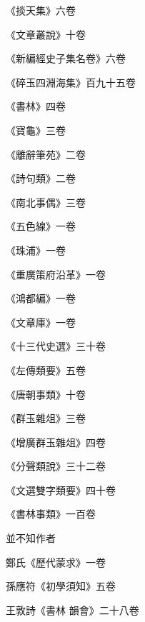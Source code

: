 \begin{pinyinscope}
 《掞天集》六卷



 《文章叢說》十卷



 《新編經史子集名卷》六卷



 《碎玉四淵海集》百九十五卷



 《書林》四卷



 《寶龜》三卷



 《離辭筆苑》二卷



 《詩句類》二卷



 《南北事偶》三卷



 《五色線》一卷



 《珠浦》一卷



 《重廣策府沿革》一卷



 《鴻都編》一卷



 《文章庫》一卷



 《十三代史選》三十卷



 《左傳類要》五卷



 《唐朝事類》十卷



 《群玉雜俎》三卷



 《增廣群玉雜俎》四卷



 《分聲類說》三十二卷



 《文選雙字類要》四十卷



 《書林事類》一百卷



 並不知作者



 鄭氏《歷代蒙求》一卷



 孫應符《初學須知》五卷



 王敦詩《書林
 韻會》二十八卷




\end{pinyinscope}
